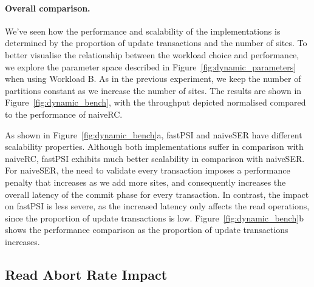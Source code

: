 \paragraph{Overall comparison.} We've seen how the performance and scalability of the implementations is determined by the proportion of update transactions and the number of sites. To better visualise the relationship between the workload choice and performance, we explore the parameter space described in Figure~\ref{fig:dynamic_parameters} when using Workload B. As in the previous experiment, we keep the number of partitions constant as we increase the number of sites. The results are shown in Figure~\ref{fig:dynamic_bench}, with the throughput depicted normalised compared to the performance of naiveRC.

As shown in Figure~\ref{fig:dynamic_bench}a, fastPSI and naiveSER have different scalability properties. Although both implementations suffer in comparison with naiveRC, fastPSI exhibits much better scalability in comparison with naiveSER. For naiveSER, the need to validate every transaction imposes a performance penalty that increases as we add more sites, and consequently increases the overall latency of the commit phase for every transaction. In contrast, the impact on fastPSI is less severe, as the increased latency only affects the read operations, since the proportion of update transactions is low. Figure~\ref{fig:dynamic_bench}b shows the performance comparison as the proportion of update transactions increases.

\subsection{Read Abort Rate Impact}




